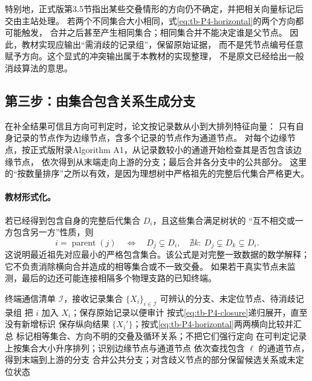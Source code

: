 特别地，正式版第3.5节指出某些交叠情形的方向仍不确定，并把相关向量标记后交由主站处理。
若两个不同集合大小相同，式\eqref{eq:tb-P4-horizontal}的两个方向都可能触发，
合并之后甚至产生相同集合；相同集合并不能决定谁是父节点。
因此，教材实现应输出“需消歧的记录组”，保留原始证据，
而不是凭节点编号任意赋予方向。这个显式的冲突输出属于本教材的实现整理，
不是原文已经给出一般消歧算法的意思。

\subsection{第三步：由集合包含关系生成分支}
在补全结果可信且方向可判定时，论文按记录数从小到大排列特征向量：
只有自身记录的节点作为边缘节点，含多个记录的节点作为通道节点。
对每个边缘节点，按正式版附录Algorithm A1，从记录数较小的通道开始检查其是否包含该边缘节点，
依次得到从末端走向上游的分支；最后合并各分支中的公共部分。
这里的“按数量排序”之所以有效，是因为理想树中严格祖先的完整后代集合严格更大。

\paragraph{教材形式化。}
若已经得到包含自身的完整后代集合 $D_i$，且这些集合满足树状的
“互不相交或一方包含另一方”性质，则
\[
 i=\operatorname{parent}(j)
 \quad\Longleftrightarrow\quad
 D_j\subsetneq D_i,\quad
 \nexists k:\ D_j\subsetneq D_k\subsetneq D_i.
\]
这说明最近祖先对应最小的严格包含集合。该公式是对完整一致数据的数学解释；
它不负责消除横向合并造成的相等集合或不一致交叠。
如果若干真实节点未监测，最后的边还可能连接相隔多个物理支路的已知终端。

\begin{algorithm}[htbp]
\caption{P4 的记录整理主线；歧义与一致性检查为教材显式补充}
\label{alg:tb-P4}
\begin{algorithmic}[1]
\Require 终端通信清单 $\mathcal I$，接收记录集合 $\{X_i\}_{i\in\mathcal I}$
\Ensure 可辨认的分支、未定位节点、待消歧记录组
 \State 把 $i$ 加入 $X_i$；保存原始记录以便审计
\EndFor
\State 按式\eqref{eq:tb-P4-closure}递归展开，直至没有新增标识
\State 保存纵向结果 $\{X_i'\}$；按式\eqref{eq:tb-P4-horizontal}两两横向比较并汇总
\State 标记相等集合、方向不明的交叠及循环关系；不把它们强行定向
\State 在可判定记录上按集合大小升序排列；识别边缘节点与通道节点
 \State 依次查找包含 $\ell$ 的通道节点，得到末端到上游的分支
\EndFor
\State 合并公共分支；对含歧义节点的部分保留候选关系或未定位状态
\end{algorithmic}
\end{algorithm}

